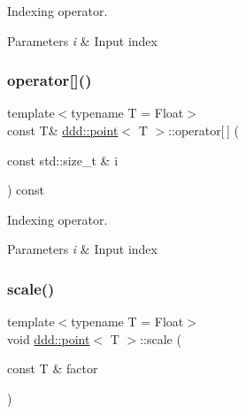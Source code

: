 Indexing operator. 


\begin{DoxyParams}{Parameters}
{\em i} & Input index \\
\hline
\end{DoxyParams}
\mbox{\label{classddd_1_1point_a320e2bfca11915c5ebb9ed0581a3cab1}} 
\subsubsection{\texorpdfstring{operator[]()}{operator[]()}\hspace{0.1cm}{\footnotesize\ttfamily [2/2]}}
{\footnotesize\ttfamily template$<$typename T = Float$>$ \\
const T\& \hyperlink{classddd_1_1point}{ddd\+::point}$<$ T $>$\+::operator\mbox{[}$\,$\mbox{]} (\begin{DoxyParamCaption}\item[{const std\+::size\+\_\+t \&}]{i }\end{DoxyParamCaption}) const\hspace{0.3cm}{\ttfamily [inline]}}



Indexing operator. 


\begin{DoxyParams}{Parameters}
{\em i} & Input index \\
\hline
\end{DoxyParams}
\mbox{\label{classddd_1_1point_a5edb11d18e78ff66bc7aa2a5f26b8aa4}} 
\subsubsection{\texorpdfstring{scale()}{scale()}}
{\footnotesize\ttfamily template$<$typename T = Float$>$ \\
void \hyperlink{classddd_1_1point}{ddd\+::point}$<$ T $>$\+::scale (\begin{DoxyParamCaption}\item[{const T \&}]{factor }\end{DoxyParamCaption})\hspace{0.3cm}{\ttfamily [inline]}}



